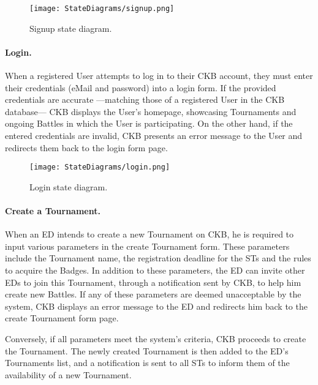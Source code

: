 \begin{figure}[H]
    \begin{center}
        \texttt{[image: StateDiagrams/signup.png]}
        \caption{Signup state diagram.}
        \label{fig:signup_sd}%
    \end{center}
\end{figure}

\paragraph{Login.}
When a registered User attempts to log in to their CKB account, they must enter their credentials (eMail and password) into a login form. If the provided credentials are accurate —matching those of a registered User in the CKB database— CKB displays the User's homepage, showcasing Tournaments and ongoing Battles in which the User is participating. On the other hand, if the entered credentials are invalid, CKB presents an error message to the User and redirects them back to the login form page.

\begin{figure}[H]
    \begin{center}
        \texttt{[image: StateDiagrams/login.png]}
        \caption{Login state diagram.}
        \label{fig:login_sd}%
    \end{center}
\end{figure}

\newpage

\paragraph{Create a Tournament.}
When an ED intends to create a new Tournament on CKB, he is required to input various parameters in the create Tournament form. These parameters include the Tournament name, the registration deadline for the STs and the rules to acquire the Badges. In addition to these parameters, the ED can invite other EDs to join this Tournament, through a notification sent by CKB, to help him create new Battles. If any of these parameters are deemed unacceptable by the system, CKB displays an error message to the ED and redirects him back to the create Tournament form page.

Conversely, if all parameters meet the system's criteria, CKB proceeds to create the Tournament. The newly created Tournament is then added to the ED's Tournaments list, and a notification is sent to all STs to inform them of the availability of a new Tournament.

